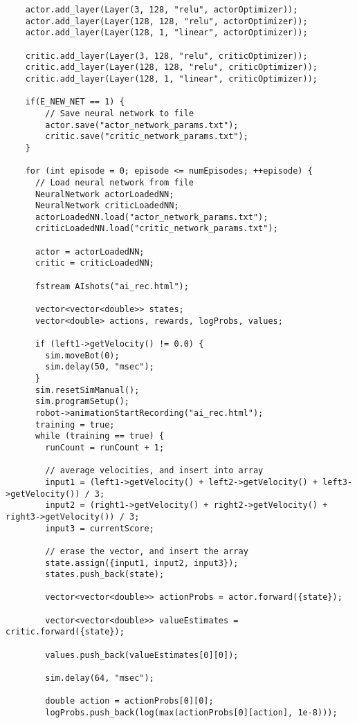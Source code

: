 \begin{verbatim}
    actor.add_layer(Layer(3, 128, "relu", actorOptimizer));
    actor.add_layer(Layer(128, 128, "relu", actorOptimizer));
    actor.add_layer(Layer(128, 1, "linear", actorOptimizer));
 
    critic.add_layer(Layer(3, 128, "relu", criticOptimizer));
    critic.add_layer(Layer(128, 128, "relu", criticOptimizer));
    critic.add_layer(Layer(128, 1, "linear", criticOptimizer));
 
    if(E_NEW_NET == 1) {
        // Save neural network to file
        actor.save("actor_network_params.txt");
        critic.save("critic_network_params.txt");
    }
 
    for (int episode = 0; episode <= numEpisodes; ++episode) {
      // Load neural network from file
      NeuralNetwork actorLoadedNN;
      NeuralNetwork criticLoadedNN;
      actorLoadedNN.load("actor_network_params.txt");
      criticLoadedNN.load("critic_network_params.txt");
 
      actor = actorLoadedNN;
      critic = criticLoadedNN;
 
      fstream AIshots("ai_rec.html");
 
      vector<vector<double>> states;
      vector<double> actions, rewards, logProbs, values;
 
      if (left1->getVelocity() != 0.0) {
        sim.moveBot(0);
        sim.delay(50, "msec");
      }
      sim.resetSimManual();
      sim.programSetup();
      robot->animationStartRecording("ai_rec.html");
      training = true;
      while (training == true) {
        runCount = runCount + 1;
 
        // average velocities, and insert into array
        input1 = (left1->getVelocity() + left2->getVelocity() + left3->getVelocity()) / 3;
        input2 = (right1->getVelocity() + right2->getVelocity() + right3->getVelocity()) / 3;
        input3 = currentScore;
 
        // erase the vector, and insert the array
        state.assign({input1, input2, input3});
        states.push_back(state);
 
        vector<vector<double>> actionProbs = actor.forward({state});
 
        vector<vector<double>> valueEstimates = critic.forward({state});
 
        values.push_back(valueEstimates[0][0]);        
 
        sim.delay(64, "msec");
 
        double action = actionProbs[0][0];
        logProbs.push_back(log(max(actionProbs[0][action], 1e-8)));
 

\end{verbatim}
